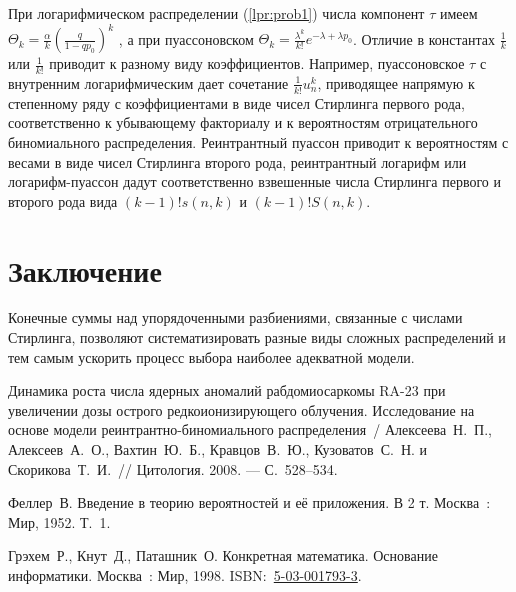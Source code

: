 \documentclass{math-mech-sci}
\begin{document}
При логарифмическом  распределении   (\ref{lpr:prob1}) числа компонент $\tau$  имеем  $\Theta_k=\frac\alpha k\left( \frac q{1-qp_0}\right)^k$ ,  а при пуассоновском 
 $\Theta_k=\frac{\lambda^k}{k!}e^{-\lambda+\lambda p_0}$. Отличие  в константах  $\frac 1 k$ или $\frac 1 {k!}$ приводит к разному виду коэффициентов. Например, пуассоновское $\tau$ с внутренним логарифмическим дает сочетание $\frac 1{k!}u_n^k$, приводящее напрямую к степенному ряду с коэффициентами в виде чисел Стирлинга первого рода,  соответственно к  убывающему факториалу и к вероятностям отрицательного  биномиального  распределения. Реинтрантный пуассон приводит к вероятностям с весами в виде чисел Стирлинга второго рода, реинтрантный логарифм или логарифм-пуассон дадут соответственно  взвешенные числа Стирлинга первого и второго рода вида $(k-1)!s(n,k)$  и $(k-1)!S(n,k)$.  

	\section{Заключение}
	
	Конечные суммы над упорядоченными разбиениями, связанные с числами Стирлинга, позволяют систематизировать разные виды сложных распределений и тем самым  ускорить процесс выбора наиболее адекватной модели. 
	
	
	\begin{thebibliography}{8}
	
	 Динамика роста числа ядерных аномалий
	рабдомиосаркомы RA-23 при увеличении дозы острого редкоионизирующего облучения. Исследование на основе модели реинтрантно-биномиального распределения~/ Алексеева~Н.~П., Алексеев~А.~О., Вахтин~Ю.~Б., Кравцов~В.~Ю., Кузоватов~С.~Н. и Скорикова~Т.~И.~// Цитология. 2008. --- С.~528--534.
	
	 Феллер~В. Введение в теорию вероятностей и её приложения. В 2 т.
	\newblock Москва~: Мир, 1952.
	\newblock Т.~1.
	
	 Грэхем~Р., Кнут~Д., Паташник~О. Конкретная
	математика. Основание информатики.
	\newblock Москва~: Мир, 1998.
	\newblock ISBN:~\href{http://isbndb.com/search-all.html?kw=5-03-001793-3}{5-03-001793-3}.
	
	\end{thebibliography}
\end{document}

